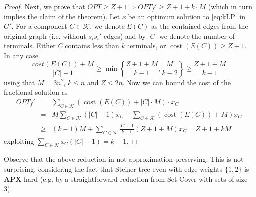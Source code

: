 \documentclass[11pt, letterpaper]{article}
\theoremstyle{definition}
\DeclareMathOperator{\cost}{cost}
\newcommand{\comp}{\mathcal{K}}
\begin{document}
\begin{proof}
Next, we prove that $OPT \geq Z+1 \Rightarrow OPT_f' \geq Z+1 + k\cdot M$ (which in turn implies the claim of the theorem).
Let $x$ be an optimum solution to \eqref{eq:kLP} in $G'$.
For a component $C \in \comp$, we denote $E(C)$ as the contained edges from the 
original graph (i.e. without $s_is_i'$ edges) and by $|C|$ we denote the number of terminals.
Either $C$ contains less than $k$ terminals, or $\cost(E(C)) \geq Z+1$. In any case 
\[
\frac{cost(E(C)) + M}{|C| - 1}
\geq \min\left\{ \frac{Z+1 + M}{k - 1}, \frac{M}{k - 2} \right\} \geq \frac{Z+1 + M}{k - 1}
\]
using that $M = 3n^2$, $k\leq n$ and $Z \leq 2n$.
Now we can bound the cost of the fractional solution as
\begin{eqnarray*}
OPT_f' &=& \sum_{C \in \comp} (\cost(E(C))  + |C|\cdot M)\cdot x_{C} \\
&=& M\sum_{C \in \comp} (|C|-1)x_C + \sum_{C \in \comp} ( \cost(E(C)) + M)x_C \\
&\geq& (k-1)M + \sum_{C \in \comp} \frac{|C| - 1}{k -1}(Z+1+M) x_C
= Z+1+kM 
\end{eqnarray*}
exploiting $\sum_{C \in \comp} x_C ( |C| - 1) = k - 1$. 
\end{proof}
Observe that the above reduction in not approximation preserving. This is not 
surprising, considering the fact that Steiner tree even with edge weights $\{ 1,2\}$
is $\mathbf{APX}$-hard (e.g. by a straightforward reduction from Set Cover with sets of size 3).
\end{document}

